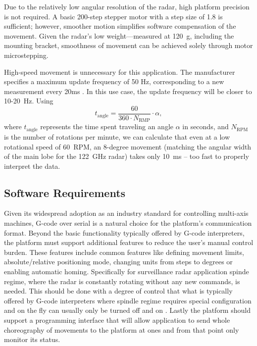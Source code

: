 Due to the relatively low angular resolution of the radar, high platform precision is not required.
A basic 200-step stepper motor with a step size of 1.8 is sufficient; however, smoother motion simplifies software compensation of the movement.
Given the radar’s low weight—measured at 120~g, including the mounting bracket, smoothness of movement can be achieved solely through motor microstepping.

High-speed movement is unnecessary for this application.
The manufacturer specifies a maximum update frequency of 50 Hz, corresponding to a new measurement every 20ms \cite{sidarMAN}.
In this use case, the update frequency will be closer to 10-20~Hz.
Using
%
\begin{equation}
  t_{\mathrm{angle}} = \frac{60}{360\cdot N_{\mathrm{RMP}}} \cdot  \alpha,
  \label{eq:poll}
\end{equation}
%
where $t_{\mathrm{angle}}$ represents the time spent traveling an angle $\alpha$ in seconds, and $N_{\mathrm{RPM}}$ is the number of rotations per minute, we can calculate that even at a low rotational speed of 60~RPM, an 8-degree movement (matching the angular width of the main lobe for the 122~GHz radar) takes only 10~ms -- too fast to properly interpret the data.


\subsection{Software Requirements}

Given its widespread adoption as an industry standard for controlling multi-axis machines, G-code over serial is a natural choice for the platform's communication format.
Beyond the basic functionality typically offered by G-code interpreters, the platform must support additional features to reduce the user's manual control burden.
These features include common features like defining movement limits, absolute/relative positioning mode, changing units from steps to degrees or enabling automatic homing.
Specifically for  surveillance radar application spinde regime, where the radar is constantly rotating without any new commands, is needed.
This should be done with a degree of control that what is typically offered by G-code interpreters where spindle regime requires special configuration  and on the fly can usually only be turned off and on \cite{duet}.
Lastly the platform should support a programming interface that will allow application to send whole choreography of movements to the platform at ones and from that point only monitor its status.

